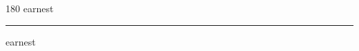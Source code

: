 
\begin{frame}
\begin{center}
\begin{turn}{180}
{\fontsize{2.5cm}{1em}\selectfont earnest}
\end{turn}
\vspace{1em}\par  
\hrule
\vspace{1em}\par  
{\fontsize{2.5cm}{1em}\selectfont earnest}
\end{center}
\end{frame}
